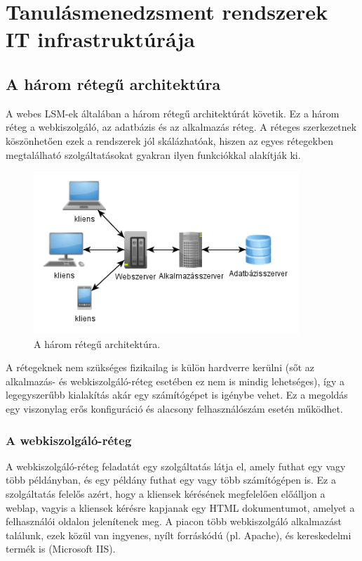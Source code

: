 \chapter{Tanulásmenedzsment rendszerek IT infrastruktúrája}
\section{A három rétegű architektúra}
A webes LSM-ek általában a három rétegű architektúrát követik. Ez a három réteg a webkiszolgáló, az adatbázis és az alkalmazás réteg. A réteges szerkezetnek köszönhetően ezek a rendszerek jól skálázhatóak, hiszen az egyes rétegekben megtalálható szolgáltatásokat gyakran ilyen funkciókkal alakítják ki.

\begin{figure}[!ht]
\centering
\includegraphics[width=100mm, keepaspectratio]{figures/3tier_simple_001.png}
\caption{A három rétegű architektúra.} 
\end{figure}
A rétegeknek nem szükséges fizikailag is külön hardverre kerülni (sőt az alkalmazás- és webkiszolgáló-réteg esetében ez  nem is mindig lehetséges), így a legegyszerűbb kialakítás akár egy számítógépet is igénybe vehet. Ez a megoldás egy viszonylag erős konfiguráció és alacsony felhasználószám esetén működhet.
\subsection{A webkiszolgáló-réteg}
A webkiszolgáló-réteg feladatát egy szolgáltatás látja el, amely futhat egy vagy több példányban, és egy példány futhat egy vagy több számítógépen is. Ez a szolgáltatás felelős azért, hogy a kliensek kérésének megfelelően előálljon a weblap, vagyis a kliensek kérésre kapjanak egy HTML dokumentumot, amelyet a felhasználói oldalon jelenítenek meg.
A piacon több webkiszolgáló alkalmazást találunk, ezek közül van ingyenes, nyílt forráskódú (pl. Apache), és kereskedelmi termék is (Microsoft IIS).

